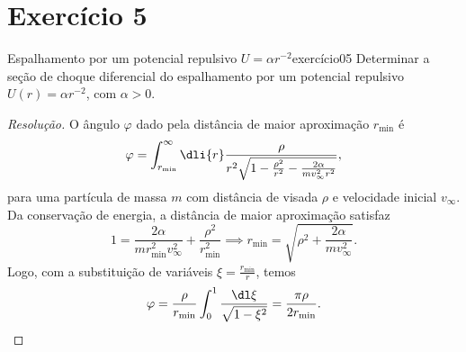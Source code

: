 \section*{Exercício 5}
\begin{exercício}{Espalhamento por um potencial repulsivo \(U = \alpha r^{-2}\)}{exercício05}
    Determinar a seção de choque diferencial do espalhamento por um potencial repulsivo \(U(r) = \alpha r^{-2}\), com \(\alpha > 0\).
\end{exercício}
\begin{proof}[Resolução]
    O ângulo \(\varphi\) dado pela distância de maior aproximação \(r_\mathrm{min}\) é
    \begin{equation*}
        \varphi = \int_{r_\mathrm{min}}^\infty \dli{r} \frac{\rho}{r^2\sqrt{1 - \frac{\rho^2}{r^2} - \frac{2\alpha}{mv_\infty^2 r^2}}},
    \end{equation*}
    para uma partícula de massa \(m\) com distância de visada \(\rho\) e velocidade inicial \(v_\infty\). Da conservação de energia, a distância de maior aproximação satisfaz
    \begin{equation*}
        1 = \frac{2 \alpha}{mr_\mathrm{min}^2 v_\infty^2} + \frac{\rho^2}{r_\mathrm{min}^2} \implies r_\mathrm{min} = \sqrt{\rho^2 + \frac{2 \alpha}{m v_\infty^2}}.
    \end{equation*}
    Logo, com a substituição de variáveis \(\xi = \frac{r_\mathrm{min}}{r}\), temos
    \begin{equation*}
        \varphi = \frac{\rho}{r_\mathrm{min}} \int_0^1 \frac{\dl\xi}{\sqrt{1-\xi^2}} = \frac{\pi\rho}{2r_\mathrm{min}}.
    \end{equation*}


\end{proof}
